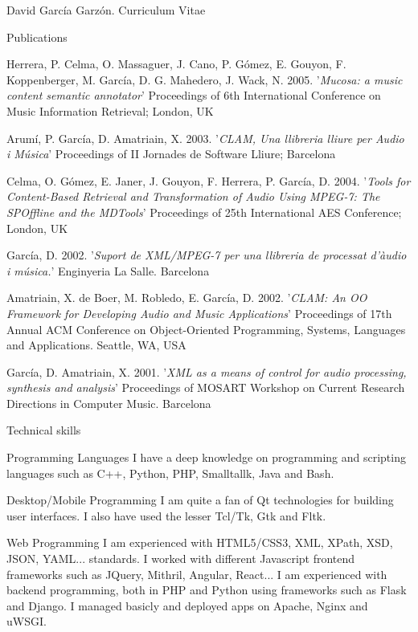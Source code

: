 \documentclass{article}
\begin{document}
\begin{cv}{David García Garzón. Curriculum Vitae}
\begin{cvlist}{Publications}
\item[] {\sc Herrera, P. Celma, O. Massaguer, J. Cano, P. Gómez, E. Gouyon, F. Koppenberger, M. García, D. G. Mahedero, J. Wack, N.} 2005.
'{\em Mucosa: a music content semantic annotator}'
Proceedings of 6th International Conference on Music Information Retrieval; London, UK

\item[] {\sc Arumí, P. García, D. Amatriain, X.} 2003.
'{\em CLAM, Una llibreria lliure per Audio i Música}'
Proceedings of II Jornades de Software Lliure; Barcelona

\item[] {\sc Celma, O. Gómez, E. Janer, J. Gouyon, F. Herrera, P. García, D.} 2004.
'{\em Tools for Content-Based Retrieval and Transformation of Audio Using MPEG-7: The SPOffline and the MDTools}'
Proceedings of 25th International AES Conference; London, UK

\item[] {\sc García, D.} 2002.
'{\em Suport de XML/MPEG-7 per una llibreria de processat d'àudio i música.}'
Enginyeria La Salle. Barcelona

\item[] {\sc Amatriain, X. de Boer, M. Robledo, E. García, D.} 2002.
'{\em CLAM: An OO Framework for Developing Audio and Music Applications}'
Proceedings of 17th Annual ACM Conference on Object-Oriented Programming, Systems, Languages and Applications. Seattle, WA, USA

\item[] {\sc García, D. Amatriain, X.} 2001.
'{\em XML as a means of control for audio processing, synthesis and analysis}'
Proceedings of MOSART Workshop on Current Research Directions in Computer Music. Barcelona
	
\end{cvlist}


\begin{cvlist}{Technical skills}

\item[Programming Languages]
	I have a deep knowledge on programming and scripting languages such  as C++, Python, PHP, Smalltallk, Java and Bash. 

\item[Desktop/Mobile Programming]
	I am quite a fan of Qt technologies for building user interfaces. I also have used the lesser Tcl/Tk, Gtk and Fltk. 

\item[Web Programming]
	I am experienced with HTML5/CSS3, XML, XPath, XSD, JSON, YAML... standards. I worked with different Javascript frontend frameworks such as JQuery, Mithril, Angular, React... I am experienced with backend programming, both in PHP and Python using frameworks such as Flask and Django. I managed basicly and deployed apps on Apache, Nginx and uWSGI. 


\end{cvlist}
\end{cv}
\end{document}
